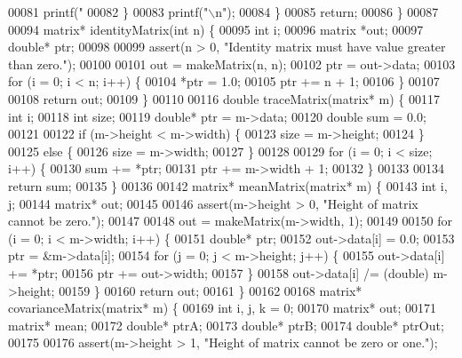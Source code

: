 \begin{DoxyCode}
{{00081             printf(\textcolor{stringliteral}{" %
00082         \}
00083         printf(\textcolor{stringliteral}{"\(\backslash\)n"});
00084     \}
00085     \textcolor{keywordflow}{return};
00086 \}
00087 
00094 matrix* identityMatrix(\textcolor{keywordtype}{int} n) \{
00095     \textcolor{keywordtype}{int} i;
00096     matrix *out;
00097     \textcolor{keywordtype}{double}* ptr;
00098 
00099     assert(n > 0, \textcolor{stringliteral}{"Identity matrix must have value greater than zero."});
00100 
00101     out = makeMatrix(n, n);
00102     ptr = out->data;
00103     \textcolor{keywordflow}{for} (i = 0; i < n; i++) \{
00104         *ptr = 1.0;
00105         ptr += n + 1;
00106     \}
00107 
00108     \textcolor{keywordflow}{return} out;
00109 \}
00110 
00116 \textcolor{keywordtype}{double} traceMatrix(matrix* m) \{
00117     \textcolor{keywordtype}{int} i;
00118     \textcolor{keywordtype}{int} size;
00119     \textcolor{keywordtype}{double}* ptr = m->data;
00120     \textcolor{keywordtype}{double} sum = 0.0;
00121 
00122     \textcolor{keywordflow}{if} (m->height < m->width) \{
00123         size = m->height;
00124     \}
00125     \textcolor{keywordflow}{else} \{
00126         size = m->width;
00127     \}
00128 
00129     \textcolor{keywordflow}{for} (i = 0; i < size; i++) \{
00130         sum += *ptr;
00131         ptr += m->width + 1;
00132     \}
00133 
00134     \textcolor{keywordflow}{return} sum;
00135 \}
00136 
00142 matrix* meanMatrix(matrix* m) \{
00143     \textcolor{keywordtype}{int} i, j;
00144     matrix* out;
00145 
00146     assert(m->height > 0, \textcolor{stringliteral}{"Height of matrix cannot be zero."});
00147 
00148     out = makeMatrix(m->width, 1);
00149 
00150     \textcolor{keywordflow}{for} (i = 0; i < m->width; i++) \{
00151         \textcolor{keywordtype}{double}* ptr;
00152         out->data[i] = 0.0;
00153         ptr = &m->data[i];
00154         \textcolor{keywordflow}{for} (j = 0; j < m->height; j++) \{
00155             out->data[i] += *ptr;
00156             ptr += out->width;
00157         \}
00158         out->data[i] /= (double) m->height;
00159     \}
00160     \textcolor{keywordflow}{return} out;
00161 \}
00162 
00168 matrix* covarianceMatrix(matrix* m) \{
00169     \textcolor{keywordtype}{int} i, j, k = 0;
00170     matrix* out;
00171     matrix* mean;
00172     \textcolor{keywordtype}{double}* ptrA;
00173     \textcolor{keywordtype}{double}* ptrB;
00174     \textcolor{keywordtype}{double}* ptrOut;
00175 
00176     assert(m->height > 1, \textcolor{stringliteral}{"Height of matrix cannot be zero or one."});
}}}
\end{DoxyCode}
